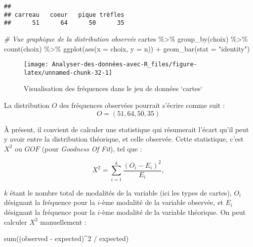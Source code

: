 \documentclass[
]{book}
\newenvironment{Shaded}{\begin{snugshade}}{\end{snugshade}}
\newcommand{\AttributeTok}[1]{\textcolor[rgb]{0.77,0.63,0.00}{#1}}
\newcommand{\CommentTok}[1]{\textcolor[rgb]{0.56,0.35,0.01}{\textit{#1}}}
\newcommand{\DecValTok}[1]{\textcolor[rgb]{0.00,0.00,0.81}{#1}}
\newcommand{\FunctionTok}[1]{\textcolor[rgb]{0.00,0.00,0.00}{#1}}
\newcommand{\NormalTok}[1]{#1}
\newcommand{\SpecialCharTok}[1]{\textcolor[rgb]{0.00,0.00,0.00}{#1}}
\newcommand{\StringTok}[1]{\textcolor[rgb]{0.31,0.60,0.02}{#1}}
\begin{document}
\begin{verbatim}
## 
## carreau   coeur   pique trèfles 
##      51      64      50      35
\end{verbatim}

\begin{Shaded}
\begin{Highlighting}[]
\CommentTok{\# Vue graphique de la distribution observée}
\NormalTok{cartes }\SpecialCharTok{\%\textgreater{}\%} 
  \FunctionTok{group\_by}\NormalTok{(choix) }\SpecialCharTok{\%\textgreater{}\%} 
  \FunctionTok{count}\NormalTok{(choix) }\SpecialCharTok{\%\textgreater{}\%} 
  \FunctionTok{ggplot}\NormalTok{(}\FunctionTok{aes}\NormalTok{(}\AttributeTok{x =}\NormalTok{ choix, }\AttributeTok{y =}\NormalTok{ n)) }\SpecialCharTok{+} 
  \FunctionTok{geom\_bar}\NormalTok{(}\AttributeTok{stat =} \StringTok{"identity"}\NormalTok{)}
\end{Highlighting}
\end{Shaded}

\begin{figure}

{\centering \texttt{[image: Analyser-des-données-avec-R\_files/figure-latex/unnamed-chunk-32-1]} 

}

\caption{Visualisation des fréquences dans le jeu de données `cartes`}\label{fig:unnamed-chunk-32}
\end{figure}

La distribution \(O\) des fréquences observées pourrait s'écrire comme suit :
\[O = (51, 64, 50, 35)\]

À présent, il convient de calculer une statistique qui résumerait l'écart qu'il peut y avoir entre la distribution théorique, et celle observée. Cette statistique, c'est \(X^2\) ou \(GOF\) (pour \emph{Goodness Of Fit}), tel que :

\[X^2 = \sum_{i=1}^{k} \frac{(O_{i} - E_{i})^2}{E_{i}},\]

\(k\) étant le nombre total de modalités de la variable (ici les types de cartes), \(O_{i}\) désignant la fréquence pour la \(i\)-ème modalité de la variable observée, et \(E_{i}\) désignant la fréquence pour la \(i\)-ème modalité de la variable théorique. On peut calculer \(X^2\) manuellement :

\begin{Shaded}
\begin{Highlighting}[]
\FunctionTok{sum}\NormalTok{((observed }\SpecialCharTok{{-}}\NormalTok{ expected)}\SpecialCharTok{\^{}}\DecValTok{2} \SpecialCharTok{/}\NormalTok{ expected)}
\end{Highlighting}
\end{Shaded}
\end{document}
